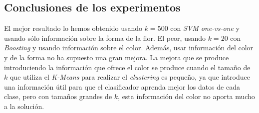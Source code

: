 \documentclass[paper=a4, fontsize=11pt]{article} %
\numberwithin{equation}{section} %
\numberwithin{figure}{section} %
\numberwithin{table}{section} %
\begin{document}
\subsection{Conclusiones de los experimentos}
El mejor resultado lo hemos obtenido usando $k=500$ con \textit{SVM one-vs-one} y usando sólo información sobre la forma de la flor. El peor, usando $k=20$ con \textit{Boosting} y usando información sobre el color. Además, usar información del color y de la forma no ha supuesto una gran mejora. La mejora que se produce introduciendo la información que ofrece el color se produce cuando el tamaño de $k$ que utiliza el \textit{K-Means} para realizar el \textit{clustering} es pequeño, ya que introduce una información útil para que el clasificador aprenda mejor los datos de cada clase, pero con tamaños grandes de $k$, esta información del color no aporta mucho a la solución.

\end{document}
